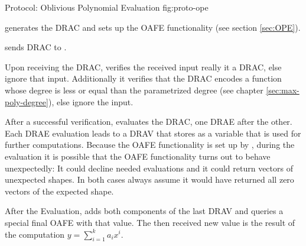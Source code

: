 \begin{JWprotocol}%
  {\JWprotoSymOPE}%
  {Protocol: Oblivious Polynomial Evaluation}%
  {fig:proto-ope}


  \begin{JWprotoSteps}

  \item \JWpOne{} generates the DRAC and sets up the OAFE functionality (see
    section \ref{sec:OPE}).

  \item \JWpOne{} sends DRAC to \JWpTwo{}.

  \end{JWprotoSteps}



  \begin{JWprotoSteps}

  \item Upon receiving the DRAC, \JWpTwo{} verifies the received input really it
    a DRAC, else ignore that input. Additionally it verifies that the DRAC
    encodes a function whose degree is less or equal than the parametrized
    degree (see chapter \ref{sec:max-poly-degree}), else ignore the input.

  \item After a successful verification, \JWpTwo{} evaluates the DRAC, one DRAE
    after the other. Each DRAE evaluation leads to a DRAV that \JWpTwo{} stores
    as a variable that is used for further computations. Because the OAFE
    functionality is set up by \JWpOne{}, during the evaluation it is possible
    that the OAFE functionality turns out to behave unexpectedly: It could
    decline needed evaluations and it could return vectors of unexpected shapes.
    In both cases always assume it would have returned all zero vectors of the
    expected shape.

  \item After the Evaluation, \JWpTwo{} adds both components of the last DRAV
    and queries a special final OAFE with that value. The then received new
    value is the result of the computation $y = \sum_{i=1}^k a_ix^i$.

  \end{JWprotoSteps}

\end{JWprotocol}

